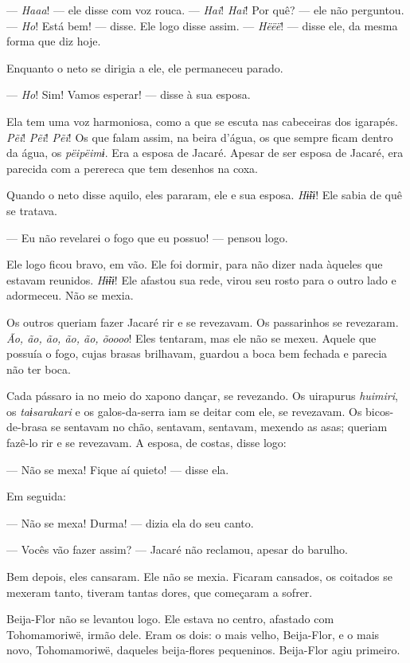 --- \textit{Haaa}! --- ele disse com voz rouca. --- \textit{Hai}! \textit{Hai}! Por quê? --- ele não perguntou. --- \textit{Ho}! Está bem! --- disse. Ele logo disse assim. --- \textit{Hëëë}! --- disse ele, da mesma forma que diz hoje. 

Enquanto o neto se dirigia a ele, ele permaneceu parado. 

--- \textit{Ho}! Sim! Vamos esperar! --- disse à sua esposa. 

Ela tem uma voz harmoniosa, como a que se escuta nas cabeceiras dos
igarapés. \textit{Pẽi}! \textit{Pẽi}! \textit{Pẽi}! Os que falam assim, na beira d'água, os
que sempre ficam dentro da água, os \textit{pëipëimɨ}. Era a esposa de
Jacaré. Apesar de ser esposa de Jacaré, era parecida com a perereca que
tem desenhos na coxa. 

Quando o neto disse aquilo, eles pararam, ele e sua esposa. \textit{Hɨ̃ɨɨ}!
Ele sabia de quê se tratava. 

--- Eu não revelarei o fogo que eu possuo! --- pensou logo. 

Ele logo ficou bravo, em vão. Ele foi dormir, para não dizer nada
àqueles que estavam reunidos. \textit{Hɨ̃ɨɨ}! Ele afastou sua rede, virou
seu rosto para o outro lado e adormeceu. Não se mexia. 

Os outros queriam fazer Jacaré rir e se revezavam. Os passarinhos se
revezaram. \textit{Ão, ão, ão, ão, ão, õoooo}! Eles tentaram, mas ele não
se mexeu. Aquele que possuía o fogo, cujas brasas brilhavam, guardou a
boca bem fechada e parecia não ter boca. 

Cada pássaro ia no meio do xapono dançar, se revezando.
Os uirapurus \textit{huimiri}, os \textit{taɨsarakari} e os galos-da-serra iam se deitar
com ele, se revezavam. Os bicos-de-brasa se sentavam no chão, sentavam,
sentavam, mexendo as asas; queriam fazê-lo rir e se revezavam. A esposa,
de costas, disse logo: 

--- Não se mexa! Fique aí quieto! --- disse ela.

Em seguida:

--- Não se mexa! Durma! --- dizia ela do seu canto.

--- Vocês vão fazer assim? --- Jacaré não reclamou, apesar do barulho. 

Bem depois, eles cansaram. Ele não se mexia. Ficaram cansados, os
coitados se mexeram tanto, tiveram tantas dores, que começaram a
sofrer. 

Beija-Flor não se levantou logo. Ele estava no centro, afastado com
Tohomamoriwë, irmão dele. Eram os dois: o mais velho, Beija-Flor, e o
mais novo, Tohomamoriwë, daqueles beija-flores pequeninos. Beija-Flor
agiu primeiro. 

